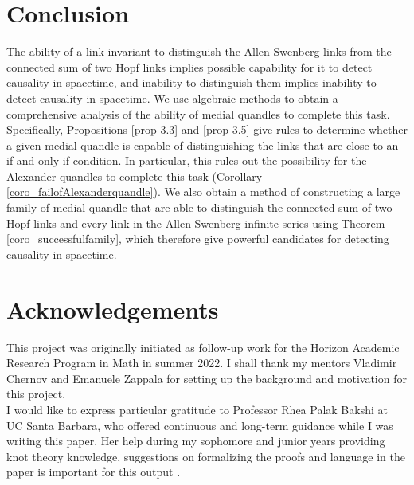 \documentclass[12pt, letterpaper]{article}
\theoremstyle{plain}
\theoremstyle{definition}
\begin{document}
\section{Conclusion} \label{secconclusion}
The ability of a link invariant to distinguish the Allen-Swenberg links from the connected sum of two Hopf links implies possible capability for it to detect causality in spacetime, and inability to distinguish them implies inability to detect causality in spacetime. We use  algebraic methods to obtain a comprehensive analysis of the ability of medial quandles to complete this task. Specifically, Propositions \ref{prop 3.3} and \ref{prop 3.5} give rules to determine whether a given medial quandle is capable of distinguishing the links that are close to an if and only if condition. In particular, this rules out the possibility for the Alexander quandles to complete this task (Corollary \ref{coro_failofAlexanderquandle}). We also obtain a method of constructing a large family of medial quandle that are able to distinguish the connected sum of two Hopf links and every link in the Allen-Swenberg infinite series using Theorem \ref{coro_successfulfamily}, which therefore give powerful candidates for detecting causality in spacetime.


\section{Acknowledgements}
This project was originally initiated as follow-up work for the Horizon Academic Research Program in Math in summer 2022. I shall thank my mentors Vladimir Chernov and Emanuele Zappala for setting up the background and motivation for this project.\\
I would like to express particular gratitude to Professor Rhea Palak Bakshi at UC Santa Barbara, who offered continuous and long-term guidance while I was writing this paper. Her help during my sophomore and junior years providing knot theory knowledge, suggestions on formalizing the proofs and language in the paper is important for this output .
\end{document}
